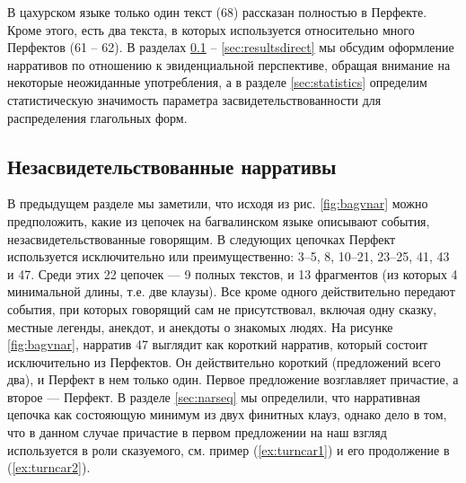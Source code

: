 В цахурском языке только один текст (68) рассказан полностью в Перфекте. Кроме этого, есть два текста, в которых используется относительно много Перфектов (61 -- 62). В разделах \ref{sec:resultsindirect} -- \ref{sec:resultsdirect} мы обсудим оформление нарративов по отношению к эвиденциальной перспективе, обращая внимание на некоторые неожиданные употребления, а в разделе \ref{sec:statistics} определим статистическую значимость параметра засвидетельствованности для распределения глагольных форм.

\subsection{Незасвидетельствованные нарративы} \label{sec:resultsindirect}

В предыдущем разделе мы заметили, что исходя из рис. \ref{fig:bagvnar} можно предположить, какие из цепочек на багвалинском языке описывают события, незасвидетельствованные говорящим. В следующих цепочках Перфект используется исключительно или преимущественно: 3--5, 8, 10--21, 23--25, 41, 43 и 47. Среди этих 22 цепочек --- 9 полных текстов, и 13 фрагментов (из которых 4 минимальной длины, т.е. две клаузы). Все кроме одного действительно передают события, при которых говорящий сам не присутствовал, включая одну сказку, местные легенды, анекдот, и анекдоты о знакомых людях. На рисунке \ref{fig:bagvnar}, нарратив 47 выглядит как короткий нарратив, который состоит исключительно из Перфектов. Он действительно короткий (предложений всего два), и Перфект в нем только один. Первое предложение возглавляет причастие, а второе — Перфект. В разделе \ref{sec:narseq} мы определили, что нарративная цепочка как состояющую минимум из двух финитных клауз, однако дело в том, что в данном случае причастие в первом предложении на наш взгляд используется в роли сказуемого, см. пример (\ref{ex:turncar1}) и его продолжение в (\ref{ex:turncar2}).


